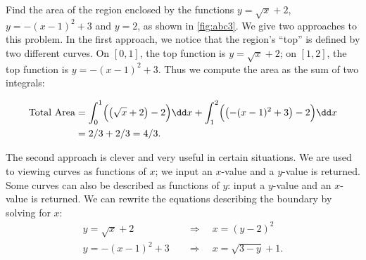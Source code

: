 \begin{example}\label{ex_abc3}
Find the area of the region enclosed by the functions $y=\sqrt{x}+2$, $y=-(x-1)^2+3$ and $y=2$, as shown in \autoref{fig:abc3}.
\solution
We give two approaches to this problem. In the first approach, we notice that the region's ``top'' is defined by two different curves. On $[0,1]$, the top function is $y=\sqrt{x}+2$; on $[1,2]$, the top function is $y=-(x-1)^2+3$. Thus we compute the area as the sum of two integrals:

\begin{align*}
	\text{Total Area}
	&= \int_0^1 \Bigl(\bigl(\sqrt{x}+2\bigr)-2\Bigr)\dd x + \int_1^2 \Bigl(\bigl(-(x-1)^2+3\bigr)-2\Bigr)\dd x \\
	&= 2/3 + 2/3
	=4/3.
\end{align*}

The second approach is clever and very useful in certain situations. We are used to viewing curves as functions of $x$; we input an $x$-value and a $y$-value is returned. Some curves can also be described as functions of $y$: input a $y$-value and an $x$-value is returned. We can rewrite the equations describing the boundary by solving for $x$:\vspace{-.3\baselineskip}
\begin{align*}
y=\sqrt{x}+2 & \quad\Rightarrow\quad x=(y-2)^2 \\
y=-(x-1)^2+3 & \quad\Rightarrow\quad x=\sqrt{3-y}+1.
\end{align*}



\end{example}
